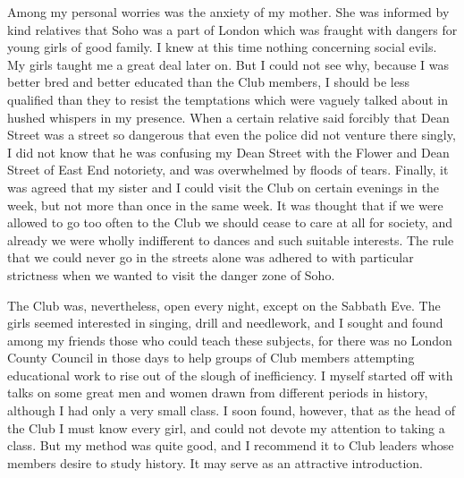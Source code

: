 Among my personal worries was the anxiety of my
mother. She was informed by kind relatives that Soho
was a part of London which was fraught with dangers
for young girls of good family. I knew at this time nothing
concerning social evils. My girls taught me a great
deal later on. But I could not see why, because I was
better bred and better educated than the Club members,
I should be less qualified than they to resist the temptations
which were vaguely talked about in hushed whispers
in my presence. When a certain relative said forcibly
that Dean Street was a street so dangerous that even the
police did not venture there singly, I did not know that
he was confusing my Dean Street with the Flower and
Dean Street of East End notoriety, and was overwhelmed
by floods of tears. Finally, it was agreed that my sister
and I could visit the Club on certain evenings in the week,
but not more than once in the same week. It was thought
that if we were allowed to go too often to the Club we
should cease to care at all for society, and already we
were wholly indifferent to dances and such suitable
interests. The rule that we could never go in the streets
alone was adhered to with particular strictness when we
wanted to visit the danger zone of Soho.

The Club was, nevertheless, open every night, except
on the Sabbath Eve. The girls seemed interested in
singing, drill and needlework, and I sought and found
among my friends those who could teach these subjects,
for there was no London County Council in those days to
help groups of Club members attempting educational
work to rise out of the slough of inefficiency. I myself
started off with talks on some great men and women
drawn from different periods in history, although I had
only a very small class. I soon found, however, that as
the head of the Club I must know every girl, and could
not devote my attention to taking a class. But my
method was quite good, and I recommend it to Club
leaders whose members desire to study history. It may
serve as an attractive introduction.

